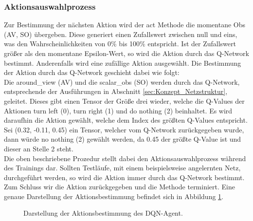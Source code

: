 \subsubsection{Aktionsauswahlprozess} \label{sec:Konzept_Aktionsauswahlprozess_DQN}
Zur Bestimmung der nächsten Aktion wird der act Methode die momentane Obs (AV, SO) übergeben.
Diese generiert einen Zufallswert zwischen null und eins, was den Wahrscheinlichkeiten von 0\% bis 100\% entspricht.
Ist der Zufallswert größer als den momentane Epsilon-Wert, so wird die Aktion durch das Q-Network bestimmt. Anderenfalls wird eine zufällige Aktion ausgewählt. Die Bestimmung der Aktion durch das Q-Network geschieht dabei wie folgt:\\
Die around\_view (AV) und die scalar\_obs (SO) werden durch das Q-Network, entsprechende der Ausführungen in Abschnitt \ref{sec:Konzept_Netzstruktur}, geleitet. Dieses gibt einen Tensor der Größe drei wieder, welche die Q-Values der Aktionen turn left (0), turn right (1) und do nothing (2) beinhaltet.
Es wird daraufhin die Aktion gewählt, welche dem Index des größten Q-Values entspricht.\\
Sei (0.32, -0.11, 0.45) ein Tensor, welcher vom Q-Network zurückgegeben wurde, dann würde no nothing (2) gewählt werden, da 0.45 der größte Q-Value ist und dieser an Stelle 2 steht.\\
Die oben beschriebene Prozedur stellt dabei den Aktionsauswahlprozess während des Trainings dar. Sollten Testläufe, mit einem beispielsweise angelernten Netz, durchgeführt werden, so wird die Aktion immer durch das Q-Network bestimmt.\\
Zum Schluss wir die Aktion zurückgegeben und die Methode terminiert. Eine genaue Darstellung der Aktionsbestimmung befindet sich in Abbildung \ref{fig:DQN-Aktionsbestimmung}.
\begin{figure}[H]
	\centering
	\def\svgscale{0.13}
	
	\caption[DQN-Aktionsbestimmung]{Darstellung der Aktionsbestimmung des DQN-Agent.}
	\label{fig:DQN-Aktionsbestimmung}
\end{figure}

